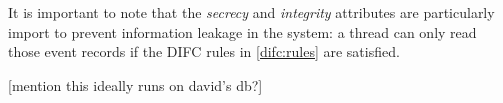 It is important to note that the \emph{secrecy} and \emph{integrity} attributes are particularly import to prevent information leakage in the system: a thread can only read those event records if the DIFC rules in \ref{difc:rules} are satisfied.

[mention this ideally runs on david's db?]











